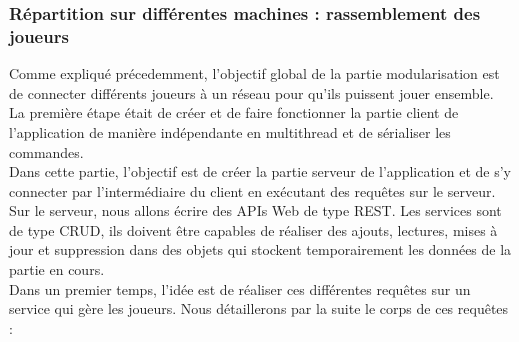 \documentclass[12pt,a4paper]{article}
\begin{document}
\subsubsection{Répartition sur différentes machines : rassemblement des joueurs}
Comme expliqué précedemment, l'objectif global de la partie modularisation est de connecter différents joueurs à un réseau pour qu'ils puissent jouer ensemble. La première étape était de créer et de faire fonctionner la partie client de l'application de manière indépendante en multithread et de sérialiser les commandes. \\Dans cette partie, l'objectif est de créer la partie serveur de l'application et de s'y connecter par l'intermédiaire du client en exécutant des requêtes sur le serveur. Sur le serveur, nous allons écrire des APIs Web de type REST. Les services sont de type CRUD, ils doivent être capables de réaliser des ajouts, lectures, mises à jour et suppression dans des objets qui stockent temporairement les données de la partie en cours.\\Dans un premier temps, l'idée est de réaliser ces différentes requêtes sur un service qui gère les joueurs. Nous détaillerons par la suite le corps de ces requêtes : 
\end{document}
